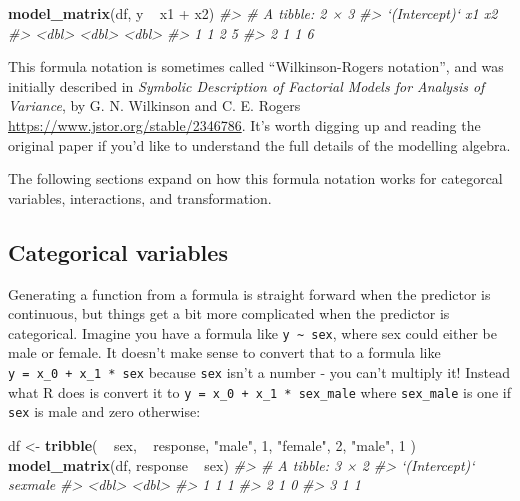 \documentclass[]{book}
\newenvironment{Shaded}{\begin{snugshade}}{\end{snugshade}}
\newcommand{\KeywordTok}[1]{\textcolor[rgb]{0.13,0.29,0.53}{\textbf{{#1}}}}
\newcommand{\DecValTok}[1]{\textcolor[rgb]{0.00,0.00,0.81}{{#1}}}
\newcommand{\StringTok}[1]{\textcolor[rgb]{0.31,0.60,0.02}{{#1}}}
\newcommand{\CommentTok}[1]{\textcolor[rgb]{0.56,0.35,0.01}{\textit{{#1}}}}
\newcommand{\NormalTok}[1]{{#1}}
\begin{document}
\begin{Shaded}
\begin{Highlighting}[]
\KeywordTok{model_matrix}\NormalTok{(df, y ~}\StringTok{ }\NormalTok{x1 +}\StringTok{ }\NormalTok{x2)}
\CommentTok{#> # A tibble: 2 × 3}
\CommentTok{#>   `(Intercept)`    x1    x2}
\CommentTok{#>           <dbl> <dbl> <dbl>}
\CommentTok{#> 1             1     2     5}
\CommentTok{#> 2             1     1     6}
\end{Highlighting}
\end{Shaded}

This formula notation is sometimes called ``Wilkinson-Rogers notation'',
and was initially described in \emph{Symbolic Description of Factorial
Models for Analysis of Variance}, by G. N. Wilkinson and C. E. Rogers
\url{https://www.jstor.org/stable/2346786}. It's worth digging up and
reading the original paper if you'd like to understand the full details
of the modelling algebra.

The following sections expand on how this formula notation works for
categorcal variables, interactions, and transformation.

\subsection{Categorical variables}\label{categorical-variables}

Generating a function from a formula is straight forward when the
predictor is continuous, but things get a bit more complicated when the
predictor is categorical. Imagine you have a formula like
\texttt{y\ \textasciitilde{}\ sex}, where sex could either be male or
female. It doesn't make sense to convert that to a formula like
\texttt{y\ =\ x\_0\ +\ x\_1\ *\ sex} because \texttt{sex} isn't a number
- you can't multiply it! Instead what R does is convert it to
\texttt{y\ =\ x\_0\ +\ x\_1\ *\ sex\_male} where \texttt{sex\_male} is
one if \texttt{sex} is male and zero otherwise:

\begin{Shaded}
\begin{Highlighting}[]
\NormalTok{df <-}\StringTok{ }\KeywordTok{tribble}\NormalTok{(}
  \NormalTok{~}\StringTok{ }\NormalTok{sex, ~}\StringTok{ }\NormalTok{response,}
  \StringTok{"male"}\NormalTok{, }\DecValTok{1}\NormalTok{,}
  \StringTok{"female"}\NormalTok{, }\DecValTok{2}\NormalTok{,}
  \StringTok{"male"}\NormalTok{, }\DecValTok{1}
\NormalTok{)}
\KeywordTok{model_matrix}\NormalTok{(df, response ~}\StringTok{ }\NormalTok{sex)}
\CommentTok{#> # A tibble: 3 × 2}
\CommentTok{#>   `(Intercept)` sexmale}
\CommentTok{#>           <dbl>   <dbl>}
\CommentTok{#> 1             1       1}
\CommentTok{#> 2             1       0}
\CommentTok{#> 3             1       1}
\end{Highlighting}
\end{Shaded}
\end{document}
